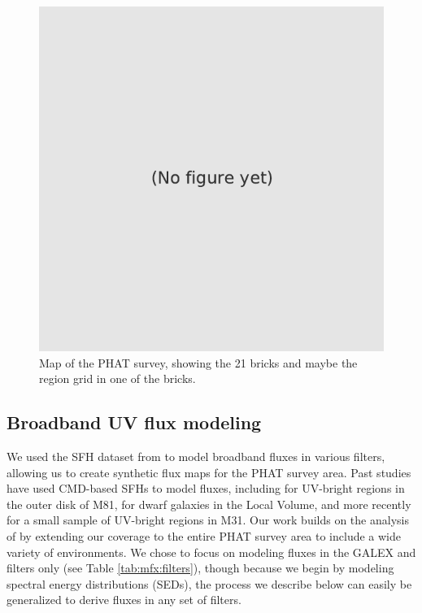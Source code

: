 \begin{figure}
\centering
\includegraphics[scale=1.0]{m31flux-figures/dummy.pdf}
\caption[PHAT survey map.]{Map of the PHAT survey, showing the 21 bricks and
    maybe the region grid in one of the bricks.
}
\label{fig:mfx:dummy1}
\end{figure}



\subsection{Broadband UV flux modeling}\label{mfx:syntheticfluxmaps:fluxmod}

We used the SFH dataset from \citet{Lewis:2014} to model broadband fluxes in
various filters, allowing us to create synthetic flux maps for the PHAT survey
area. Past studies have used CMD-based SFHs to model fluxes, including
\citet{Gogarten:2009} for UV-bright regions in the outer disk of M81,
\citet{Johnson:2013} for dwarf galaxies in the Local Volume, and more recently
\citet{Simones:2014} for a small sample of UV-bright regions in M31. Our work
builds on the analysis of \citet{Simones:2014} by extending our coverage to the
entire PHAT survey area to include a wide variety of environments. We chose to
focus on modeling fluxes in the GALEX \fuv{} and \nuv{} filters only (see Table
\ref{tab:mfx:filters}), though because we begin by modeling spectral energy
distributions (SEDs), the process we describe below can easily be generalized
to derive fluxes in any set of filters.

